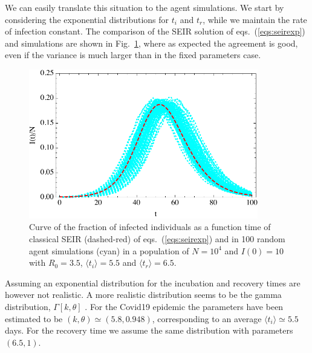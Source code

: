 \documentclass[a4paper,oneside,11pt]{article}
\begin{document}
We can easily translate this situation to the agent simulations.
We start by considering the exponential distributions for $t_i$ and $t_r$, while we maintain the rate of infection constant. The comparison of the SEIR solution of eqs.~(\ref{eqs:seirexp}) and simulations are shown in Fig.~\ref{fig:exp}, where as expected the agreement is good, even if the variance is much larger than in the fixed parameters case.
\begin{figure}[h!]
  \centering
  \includegraphics[width=10cm]{expseir.pdf}
  \caption{ Curve of the fraction of infected individuals as a function time of  classical SEIR (dashed-red) of eqs.~(\ref{eqs:seirexp}) and in 100 random agent simulations (cyan) in a  population of $N=10^4$ and $I(0)=10$ with $R_0=3.5$, $\langle t_i\rangle=5.5$ and $\langle t_r\rangle=6.5$.  }
  \label{fig:exp}
   \end{figure}

    Assuming an exponential distribution for the incubation and recovery times are however not realistic. A more realistic distribution seems to be the  gamma distribution, $\Gamma[k,\theta]$ \cite{}. For the Covid19 epidemic the parameters have been estimated to be $(k,\theta) \simeq (5.8, 0.948)$, corresponding to an average $\langle t_i\rangle \simeq 5.5$days. For the recovery time we assume the same distribution with parameters $(6.5,1)$.
\end{document}
